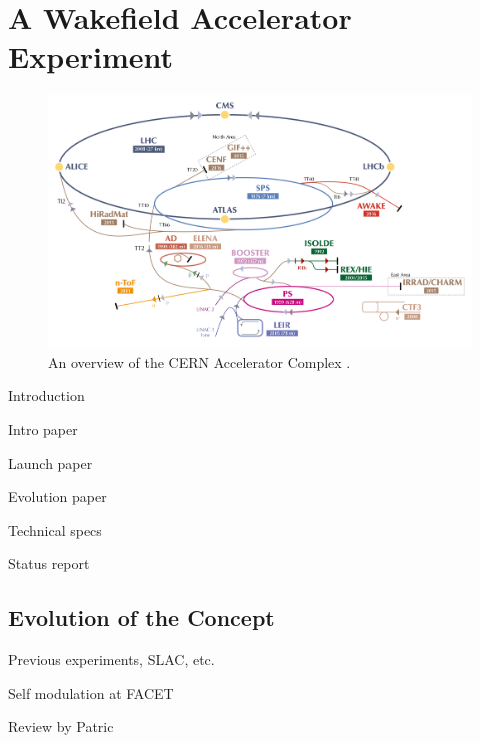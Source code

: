%
%

\chapter{A Wakefield Accelerator Experiment}
\label{Ch:WFA}

\begin{figure}[hbt]
    \centering
    \includegraphics[width=0.99\linewidth,trim={20mm 25mm 20mm 20mm},clip]{figures/AcceleratorComplex}
    \caption{\label{Fig:WFA:AccComp}
        An overview of the CERN Accelerator Complex \cite{add:mobs:2016}.}
\end{figure}

Introduction

Intro paper \cite{caldwell:2009}

Launch paper \cite{awake_collaboration:2014}

Evolution paper \cite{caldwell:2016}

Technical specs \cite{gschwendtner:2016}

Status report \cite{awake_collaboration:2016}

\section{Evolution of the Concept}
\label{WFA:History}

Previous experiments, SLAC, etc.

\cite{rosenzweig:1988, blumenfeld:2007, kallos:2008, litos:2014}

Self modulation at FACET \cite{adli:2016}

Review by Patric \cite{muggli:2009}

